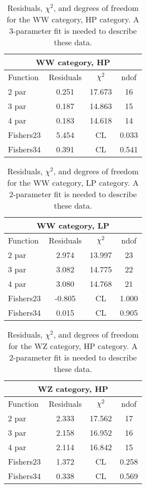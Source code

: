 \begin{table}[htb]
\centering
\begin{tabular}{|l c c c |}
\hline
\multicolumn{4}{|c|}{WW category, HP}\\
\hline
Function & Residuals & $\chi^2$ & ndof \\
\hline
2 par & 0.251 & 17.673 & 16 \\
3 par & 0.187 & 14.863 & 15 \\
4 par & 0.183 & 14.618 & 14 \\
\hline
\hline
Fishers23  & 5.454 & CL & 0.033\\
Fishers34  & 0.391 & CL & 0.541\\
\hline
\end{tabular}
\caption{Residuals, $\chi^{2}$, and degrees of freedom for the WW category, HP category. A 3-parameter fit is needed to describe these data.}
\label{tab:WW category, HP}
\end{table}
\begin{table}[htb]
\centering
\begin{tabular}{|l c c c |}
\hline
\multicolumn{4}{|c|}{WW category, LP}\\
\hline
Function & Residuals & $\chi^2$ & ndof \\
\hline
2 par & 2.974 & 13.997 & 23 \\
3 par & 3.082 & 14.775 & 22 \\
4 par & 3.080 & 14.768 & 21 \\
\hline
\hline
Fishers23  & -0.805 & CL & 1.000\\
Fishers34  & 0.015 & CL & 0.905\\
\hline
\end{tabular}
\caption{Residuals, $\chi^{2}$, and degrees of freedom for the WW category, LP category. A 2-parameter fit is needed to describe these data.}
\label{tab:WW category, LP}
\end{table}
\begin{table}[htb]
\centering
\begin{tabular}{|l c c c |}
\hline
\multicolumn{4}{|c|}{WZ category, HP}\\
\hline
Function & Residuals & $\chi^2$ & ndof \\
\hline
2 par & 2.333 & 17.562 & 17 \\
3 par & 2.158 & 16.952 & 16 \\
4 par & 2.114 & 16.842 & 15 \\
\hline
\hline
Fishers23  & 1.372 & CL & 0.258\\
Fishers34  & 0.338 & CL & 0.569\\
\hline
\end{tabular}
\caption{Residuals, $\chi^{2}$, and degrees of freedom for the WZ category, HP category. A 2-parameter fit is needed to describe these data.}
\label{tab:WZ category, HP}
\end{table}
